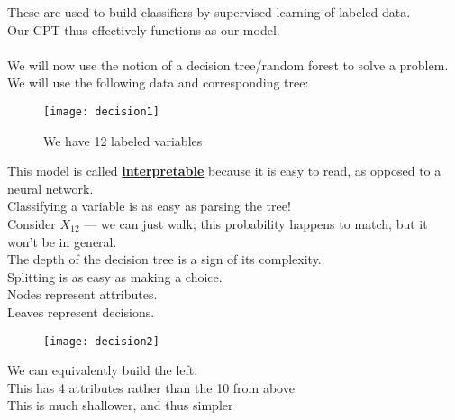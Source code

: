\documentclass[../../lecture_notes.tex]{subfiles}
\begin{document}
\begin{center}\end{center}

\noindent These are used to build classifiers by supervised learning of labeled data.\\
Our CPT thus effectively functions as our model.\\
\\
We will now use the notion of a decision tree/random forest to solve a problem.\\
We will use the following data and corresponding tree:

\begin{center}\begin{figure}[H]
	\texttt{[image: decision1]}
	\caption{We have 12 labeled variables}
\end{figure}\end{center}

\noindent This model is called \textbf{\underline{interpretable}} 
	because it is easy to read, as opposed to a neural network.\\
Classifying a variable is as easy as parsing the tree!\\
	\indent Consider $X_{12}$ — we can just walk; this probability happens to match, but it won’t be in general.\\



\noindent The depth of the decision tree is a sign of its complexity.\\
Splitting is as easy as making a choice.\\
Nodes represent attributes.\\
Leaves represent decisions.

\begin{center}\begin{minipage}{0.6\linewidth}
	\begin{figure}[H]
		\texttt{[image: decision2]}
	\end{figure}
\end{minipage}%
\begin{minipage}{0.6\linewidth}
We can equivalently build the left:\\
	\indent This has 4 attributes rather than the 10 from above\\
	\indent This is much shallower, and thus simpler
\end{minipage}\end{center}
\end{document}
